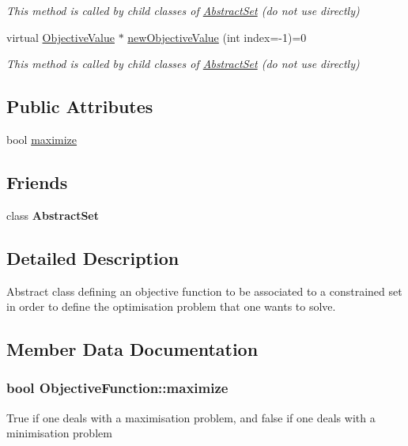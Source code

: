 \begin{DoxyCompactItemize}
\begin{DoxyCompactList}\small\item\em This method is called by child classes of \hyperlink{classAbstractSet}{Abstract\-Set} (do not use directly) \end{DoxyCompactList}\item 
\hypertarget{classObjectiveFunction_a4d302f7cdf40ca80d6d186cbf8851b8f}{virtual \hyperlink{classObjectiveValue}{Objective\-Value} $\ast$ \hyperlink{classObjectiveFunction_a4d302f7cdf40ca80d6d186cbf8851b8f}{new\-Objective\-Value} (int index=-\/1)=0}\label{classObjectiveFunction_a4d302f7cdf40ca80d6d186cbf8851b8f}

\begin{DoxyCompactList}\small\item\em This method is called by child classes of \hyperlink{classAbstractSet}{Abstract\-Set} (do not use directly) \end{DoxyCompactList}\end{DoxyCompactItemize}
\subsection*{Public Attributes}
\begin{DoxyCompactItemize}
\item 
bool \hyperlink{classObjectiveFunction_a325f3c8284ebfac0a170e0b8143dd7b5}{maximize}
\end{DoxyCompactItemize}
\subsection*{Friends}
\begin{DoxyCompactItemize}
\item 
\hypertarget{classObjectiveFunction_ab0bb5b94706efff511fee401e71bf087}{class {\bfseries Abstract\-Set}}\label{classObjectiveFunction_ab0bb5b94706efff511fee401e71bf087}

\end{DoxyCompactItemize}


\subsection{Detailed Description}
Abstract class defining an objective function to be associated to a constrained set in order to define the optimisation problem that one wants to solve. 

\subsection{Member Data Documentation}
\hypertarget{classObjectiveFunction_a325f3c8284ebfac0a170e0b8143dd7b5}{
\subsubsection[{maximize}]{\setlength{\rightskip}{0pt plus 5cm}bool Objective\-Function\-::maximize}}\label{classObjectiveFunction_a325f3c8284ebfac0a170e0b8143dd7b5}
True if one deals with a maximisation problem, and false if one deals with a minimisation problem 

